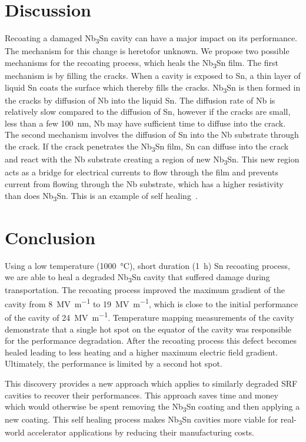 \section*{Discussion}
\label{sec:Discussion}

Recoating a damaged Nb\textsubscript{3}Sn cavity can have a major impact on its performance. The mechanism for this change is heretofor unknown. We propose two possible mechanisms for the recoating process, which heals the Nb\textsubscript{3}Sn film. The first mechanism is by filling the cracks. When a cavity is exposed to Sn, a thin layer of liquid Sn coats the surface which thereby fills the cracks. Nb\textsubscript{3}Sn is then formed in the cracks by diffusion of Nb into the liquid Sn. The diffusion rate of Nb is relatively slow compared to the diffusion of Sn, however if the cracks are small, less than a few \qty{100}{nm}, Nb may have sufficient time to diffuse into the crack. The second mechanism involves the diffusion of Sn into the Nb substrate through the crack. If the crack penetrates the Nb\textsubscript{3}Sn film, Sn can diffuse into the crack and react with the Nb substrate creating a region of new Nb\textsubscript{3}Sn. This new region acts as a bridge for electrical currents to flow through the film and prevents current from flowing through the Nb substrate, which has a higher resistivity than does Nb\textsubscript{3}Sn. This is an example of self healing~\cite{Sloof2007}.


\section{Conclusion}
\label{sec:Conclusion}

Using a low temperature (\qty{1000}{\degreeCelsius}), short duration (\qty{1}{\hour}) Sn recoating process, we are able to heal a degraded Nb\textsubscript{3}Sn cavity that suffered damage during transportation. The recoating process improved the maximum gradient of the cavity from \qty{8}{\mega\volt\per\meter} to \qty{19}{\mega\volt\per\meter}, which is close to the initial performance of the cavity of \qty{24}{\mega\volt\per\meter}. Temperature mapping measurements of the cavity demonstrate that a single hot spot on the equator of the cavity was responsible for the performance degradation. After the recoating process this defect becomes healed leading to less heating and a higher maximum electric field gradient. Ultimately, the performance is limited by a second hot spot.

This discovery provides a new approach which applies to similarly degraded SRF cavities to recover their performances. This approach saves time and money which would otherwise be spent removing the Nb\textsubscript{3}Sn coating and then applying a new coating. This self healing process makes Nb\textsubscript{3}Sn cavities more viable for real-world accelerator applications by reducing their manufacturing costs.
